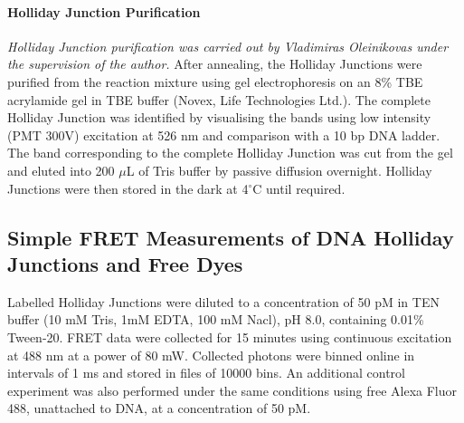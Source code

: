 \paragraph{Holliday Junction Purification}
\emph{Holliday Junction purification was carried out by \mbox{Vladimiras} Oleinikovas under the supervision of the author.}
After annealing, the Holliday Junctions were purified from the reaction mixture using gel electrophoresis on an 8\% TBE acrylamide gel in TBE buffer (Novex, Life Technologies Ltd.). The complete Holliday Junction was identified by visualising the bands using low intensity (PMT 300V) excitation at 526 nm and comparison with a 10 bp DNA ladder. The band corresponding to the complete Holliday Junction was cut from the gel and eluted into 200 $\mu$L of Tris buffer by passive diffusion overnight. Holliday Junctions were then stored in the dark at 4$^{\circ}$C until required.

\subsection{Simple FRET Measurements of DNA Holliday Junctions and Free Dyes}
\label{subsec:measure-dyes-HJ}
Labelled Holliday Junctions were diluted to a concentration of 50 pM in TEN buffer (10 mM Tris, 1mM EDTA, 100 mM Nacl), pH 8.0, containing 0.01\% Tween-20. FRET data were collected for 15 minutes using continuous excitation at 488 nm at a power of 80 mW. Collected photons were binned online in intervals of 1 ms and stored in files of 10000 bins. An additional control experiment was also performed under the same conditions using free Alexa Fluor 488, unattached to DNA, at a concentration of 50 pM. 


